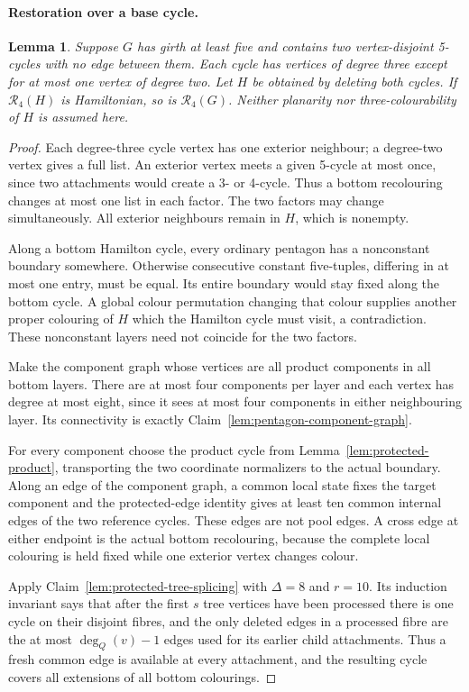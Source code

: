 \documentclass[11pt]{article}
\newtheorem{lemma}[theorem]{Lemma}
\theoremstyle{remark}
\newcommand{\R}{\mathcal R}
\numberwithin{equation}{section}
\numberwithin{table}{section}
\begin{document}
\paragraph{Restoration over a base cycle.}
\begin{lemma}\label{lem:two-pentagons-restore}
Suppose $G$ has girth at least five and contains two vertex-disjoint
5-cycles with no edge between them. Each cycle has vertices of degree
three except for at most one vertex of degree two.
Let $H$ be obtained by deleting both cycles. If $\R_4(H)$ is
Hamiltonian, so is $\R_4(G)$.
Neither planarity nor three-colourability of $H$ is assumed here.
\end{lemma}
\begin{proof}
Each degree-three cycle vertex has one exterior neighbour; a
degree-two vertex gives a full list. An exterior vertex meets a
given 5-cycle at most once, since two attachments would create a
3- or 4-cycle. Thus a bottom recolouring changes at most one list
in each factor. The two factors may change simultaneously.
All exterior neighbours remain in $H$, which is nonempty.

Along a bottom Hamilton cycle, every ordinary pentagon has a
nonconstant boundary somewhere. Otherwise consecutive constant
five-tuples, differing in at most one entry, must be equal.
Its entire boundary would stay fixed along the bottom cycle.
A global colour permutation changing that colour supplies another
proper colouring of $H$ which the Hamilton cycle must visit,
a contradiction. These nonconstant layers need not coincide
for the two factors.

Make the component graph whose vertices are all product components in
all bottom layers.  There are at most four components per layer and
each vertex has degree at most eight, since it sees at most four
components in either neighbouring layer.  Its connectivity is exactly
Claim~\ref{lem:pentagon-component-graph}.

For every component choose the product cycle from
Lemma~\ref{lem:protected-product}, transporting the two coordinate
normalizers to the actual boundary.  Along an edge of the component
graph, a common local state fixes the target component and the
protected-edge identity gives at least ten common internal edges of
the two reference cycles.  These edges are not pool edges.  A cross
edge at either endpoint is the actual bottom recolouring, because the
complete local colouring is held fixed while one exterior vertex
changes colour.

Apply Claim~\ref{lem:protected-tree-splicing} with $\Delta=8$ and
$r=10$.  Its induction invariant says that after the first $s$
tree vertices have been processed there is one cycle on their
disjoint fibres, and the only deleted edges in a processed fibre are
the at most $\deg_Q(v)-1$ edges used for its earlier child
attachments.  Thus a fresh common edge is available at every
attachment, and the resulting cycle covers all extensions of all
bottom colourings.
\end{proof}
\end{document}
